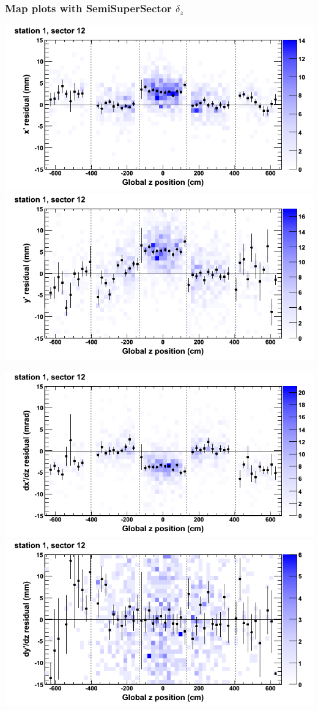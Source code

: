 \documentclass[compress]{beamer}
\begin{document}
\begin{frame}
\frametitle{Map plots with SemiSuperSector $\delta_z$}
\includegraphics[width=0.5\linewidth]{zfit_mapplots/DTvsz_st1sec12_x.png}
\includegraphics[width=0.5\linewidth]{zfit_mapplots/DTvsz_st1sec12_y.png}

\includegraphics[width=0.5\linewidth]{zfit_mapplots/DTvsz_st1sec12_dxdz.png}
\includegraphics[width=0.5\linewidth]{zfit_mapplots/DTvsz_st1sec12_dydz.png}
\end{frame}
\end{document}
